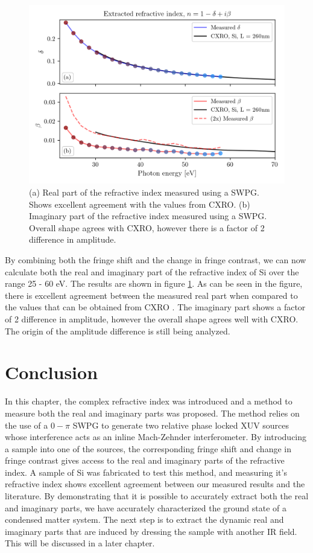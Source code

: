 \begin{figure}
	\centering
	\includegraphics[width=1.0\textwidth]{figures/refractive_index/db_cxro.png}
	\caption{(a) Real part of the refractive index measured using a SWPG.  Shows excellent agreement with the values from CXRO. (b) Imaginary part of the refractive index measured using a SWPG.  Overall shape agrees with CXRO, however there is a factor of 2 difference in amplitude.}
	\label{fig:measured_delta_beta}
\end{figure}
By combining both the fringe shift and the change in fringe contrast, we can now calculate both the real and imaginary part of the refractive index of Si over the range 25 - 60 eV.  The results are shown in figure \ref{fig:measured_delta_beta}.  As can be seen in the figure, there is excellent agreement between the measured real part when compared to the values that can be obtained from CXRO \cite{henkeXRayInteractionsPhotoabsorption1993}.  The imaginary part shows a factor of 2 difference in amplitude, however the overall shape agrees well with CXRO. The origin of the amplitude difference is still being analyzed.

\section{Conclusion}
In this chapter, the complex refractive index was introduced and a method to measure both the real and imaginary parts was proposed. The method relies on the use of a $0-\pi$ SWPG to generate two relative phase locked XUV sources whose interference acts as an inline Mach-Zehnder interferometer.  By introducing a sample into one of the sources, the corresponding fringe shift and change in fringe contrast gives access to the real and imaginary parts of the refractive index.  A sample of Si was fabricated to test this method, and measuring it's refractive index shows excellent agreement between our measured results and the literature. By demonstrating that it is possible to accurately extract both the real and imaginary parts, we have accurately characterized the ground state of a condensed matter system.  The next step is to extract the dynamic real and imaginary parts that are induced by dressing the sample with another IR field.  This will be discussed in a later chapter.



